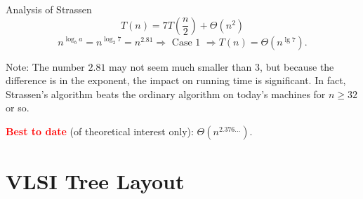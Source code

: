 \documentclass{beamer}
\newcommand{\toRight}[1]{
    \begin{FlushRight}
        {\small #1}
    \end{FlushRight}
} %
\begin{document}
\begin{frame}{Analysis of Strassen}
    $$
        T(n) = 7T\left(\frac{n}{2}\right) + \Theta(n^2)
    $$
    \pause
    $$
        n^{\log_b a} = n^{\log_2 7} = n^{2.81} \Longrightarrow \text{ Case 1 } \Longrightarrow T(n) = \Theta(n^{\lg 7}) \text{.}
    $$
    \pause
    \begin{exampleblock}{Note:}
        The number $2.81$ may not seem much smaller than $3$, but because the difference is in the exponent, the impact on running time is significant. In fact, Strassen's algorithm beats the ordinary algorithm on today’s machines for $n \geq 32$ or so.
    \end{exampleblock}
    \pause
    \toRight{\textcolor{red}{\textbf{Best to date}} (of theoretical interest only): $\Theta(n^{2.376 \ldots})$.}
\end{frame}

\section{VLSI Tree Layout}
\end{document}
